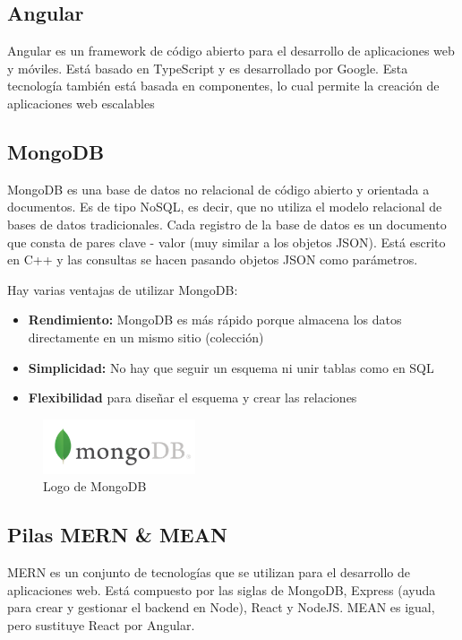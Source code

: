 \subsection{Angular}
Angular es un framework de código abierto para el desarrollo de aplicaciones web y móviles. Está basado en TypeScript y es desarrollado por Google.
Esta tecnología también está basada en componentes, lo cual permite la creación de aplicaciones web escalables

\subsection{MongoDB}
MongoDB es una base de datos no relacional de código abierto y orientada a documentos. 
Es de tipo NoSQL, es decir, que no utiliza el modelo relacional de bases de datos tradicionales.
Cada registro de la base de datos es un documento que consta de pares clave - valor (muy similar a los objetos JSON).
Está escrito en C++ y las consultas se hacen pasando objetos JSON como parámetros.

Hay varias ventajas de utilizar MongoDB:
\begin{itemize}
\item \textbf{Rendimiento:} MongoDB es más rápido porque almacena los datos directamente en un mismo sitio (colección)
\item \textbf{Simplicidad:} No hay que seguir un esquema ni unir tablas como en SQL
\item  \textbf{Flexibilidad} para diseñar el esquema y crear las relaciones
\end{itemize}
\begin{figure}[H]
    \centering
    \includegraphics[width=0.4\textwidth]{imagenes/c2/mongodb.png}
    \caption{Logo de MongoDB}
\end{figure}

\subsection{Pilas MERN \& MEAN}
MERN es un conjunto de tecnologías que se utilizan para el desarrollo de aplicaciones web. Está compuesto por las siglas de MongoDB, Express (ayuda para crear y gestionar el backend en Node), React y NodeJS. MEAN es igual, pero sustituye React por
Angular. 

